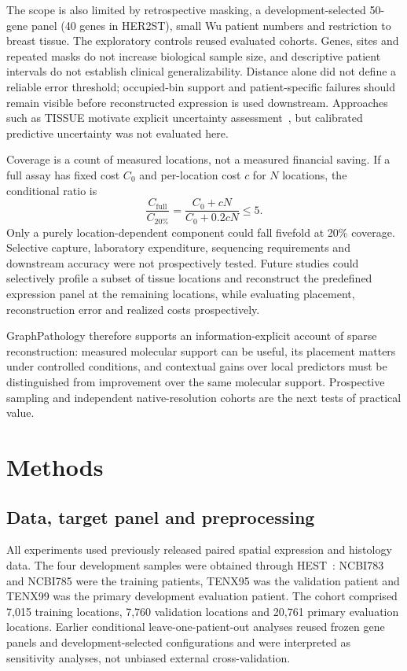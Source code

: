 The scope is also limited by retrospective masking, a development-selected 50-gene panel (40 genes in HER2ST), small Wu patient numbers and restriction to breast tissue. The exploratory controls reused evaluated cohorts. Genes, sites and repeated masks do not increase biological sample size, and descriptive patient intervals do not establish clinical generalizability. Distance alone did not define a reliable error threshold; occupied-bin support and patient-specific failures should remain visible before reconstructed expression is used downstream. Approaches such as TISSUE motivate explicit uncertainty assessment~\cite{sun2024}, but calibrated predictive uncertainty was not evaluated here.

Coverage is a count of measured locations, not a measured financial saving. If a full assay has fixed cost $C_0$ and per-location cost $c$ for $N$ locations, the conditional ratio is
\begin{equation}
\frac{C_{\mathrm{full}}}{C_{20\%}}=\frac{C_0+cN}{C_0+0.2cN}\leq5.
\label{eq:cost_ratio}
\end{equation}
Only a purely location-dependent component could fall fivefold at 20\% coverage. Selective capture, laboratory expenditure, sequencing requirements and downstream accuracy were not prospectively tested. Future studies could selectively profile a subset of tissue locations and reconstruct the predefined expression panel at the remaining locations, while evaluating placement, reconstruction error and realized costs prospectively.

GraphPathology therefore supports an information-explicit account of sparse reconstruction: measured molecular support can be useful, its placement matters under controlled conditions, and contextual gains over local predictors must be distinguished from improvement over the same molecular support. Prospective sampling and independent native-resolution cohorts are the next tests of practical value.
\section{Methods}
\subsection{Data, target panel and preprocessing}
All experiments used previously released paired spatial expression and histology data. The four development samples were obtained through HEST~\cite{jaume2024}: NCBI783 and NCBI785 were the training patients, TENX95 was the validation patient and TENX99 was the primary development evaluation patient. The cohort comprised 7,015 training locations, 7,760 validation locations and 20,761 primary evaluation locations. Earlier conditional leave-one-patient-out analyses reused frozen gene panels and development-selected configurations and were interpreted as sensitivity analyses, not unbiased external cross-validation.


